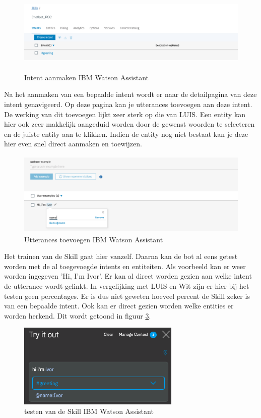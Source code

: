 \begin{figure}[h!]
	\centering
	\includegraphics[height=4cm]{img/ibm_intents.png}
	\caption{Intent aanmaken IBM Watson Assistant}
	\label{fig:intentsIbm}
\end{figure}

Na het aanmaken van een bepaalde intent wordt er naar de detailpagina van deze intent genavigeerd. Op deze pagina kan je utterances toevoegen aan deze intent. De werking van dit toevoegen lijkt zeer sterk op die van LUIS. Een entity kan hier ook zeer makkelijk aangeduid worden door de gewenst woorden te selecteren en de juiste entity aan te klikken. Indien de entity nog niet bestaat kan je deze hier even snel direct aanmaken en toewijzen.

\begin{figure}[h!]
	\centering
	\includegraphics[height=4cm]{img/imb_utterances.png}
	\caption{Utterances toevoegen IBM Watson Assistant}
	\label{fig:utterancesIbm}
\end{figure}

Het trainen van de Skill gaat hier vanzelf. Daarna kan de bot al eens getest worden met de al toegevoegde intents en entiteiten. Als voorbeeld kan er weer worden ingegeven 'Hi, I'm Ivor'. Er kan al direct worden gezien aan welke intent de utterance wordt gelinkt. In vergelijking met LUIS en Wit zijn er hier bij het testen geen percentages. Er is dus niet geweten hoeveel percent de Skill zeker is van een bepaalde intent. Ook kan er direct gezien worden welke entities er worden herkend. Dit wordt getoond in figuur \ref{fig:tryIbm}.

\begin{figure}[h!]
	\centering
	\includegraphics[height=4cm]{img/ibm_try.png}
	\caption{testen van de Skill IBM Watson Assistant}
	\label{fig:tryIbm}
\end{figure}

